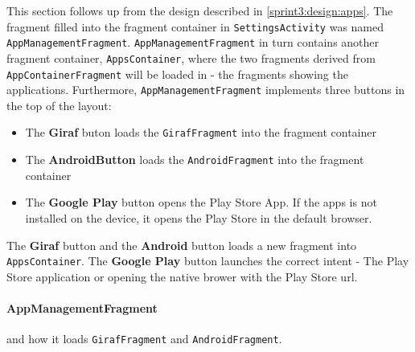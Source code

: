 
This section follows up from the design described in \cref{sprint3:design:apps}.
The fragment filled into the fragment container in \lstinline!SettingsActivity! was named \lstinline!AppManagementFragment!.
\lstinline!AppManagementFragment! in turn contains another fragment container, \lstinline!AppsContainer!, where the two fragments derived from \lstinline!AppContainerFragment! will be loaded in - the fragments showing the applications.
Furthermore, \lstinline!AppManagementFragment! implements three buttons in the top of the layout:

\begin{itemize}
\item The \textbf{Giraf} buton loads the \lstinline!GirafFragment! into the fragment container
\item The \textbf{AndroidButton} loads the \lstinline!AndroidFragment! into the fragment container
\item The \textbf{Google Play} button opens the Play Store App. If the apps is not installed on the device, it opens the Play Store in the default browser.
\end{itemize}

The \textbf{Giraf} button and the \textbf{Android} button loads a new fragment into \lstinline!AppsContainer!.
The \textbf{Google Play} button launches the correct intent - The Play Store application or opening the native brower with the Play Store url.

\paragraph{AppManagementFragment}

 and how it loads \lstinline!GirafFragment! and  \lstinline!AndroidFragment!.


